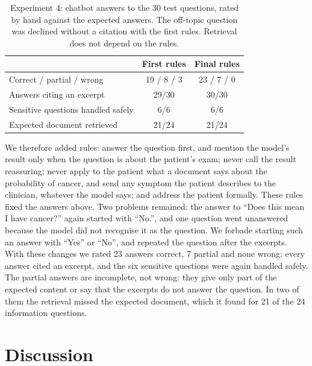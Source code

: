 \documentclass{article}
\begin{document}
\begin{table}[t]
\centering
\small
\setlength{\tabcolsep}{4pt}
\begin{tabular}{lcc}
\toprule
& First rules & Final rules \\
\midrule
Correct / partial / wrong & 19 / 8 / 3 & 23 / 7 / 0 \\
Answers citing an excerpt & 29/30 & 30/30 \\
Sensitive questions handled safely & 6/6 & 6/6 \\
Expected document retrieved & 21/24 & 21/24 \\
\bottomrule
\end{tabular}
\caption{Experiment 4: chatbot answers to the 30 test questions, rated by hand against the
expected answers. The off-topic question was declined without a citation with the first
rules. Retrieval does not depend on the rules.}
\label{tab:chatbot}
\end{table}

We therefore added rules: answer the question first, and mention the model's result only
when the question is about the patient's exam; never call the result reassuring; never
apply to the patient what a document says about the probability of cancer, and send any
symptom the patient describes to the clinician, whatever the model says; and address the
patient formally. These rules fixed the answers above. Two problems remained: the answer to
``Does this mean I have cancer?'' again started with ``No.'', and one question went
unanswered because the model did not recognise it as the question. We forbade starting such
an answer with ``Yes'' or ``No'', and repeated the question after the excerpts. With these
changes we rated 23
answers correct, 7 partial and none wrong; every answer cited an excerpt, and the six
sensitive questions were again handled safely. The partial
answers are incomplete, not wrong: they give only part of the expected content or say that
the excerpts do not answer the question. In two of them the retrieval missed the expected
document, which it found for 21 of the 24 information questions.

\section{Discussion}
\label{sec:discussion}
\end{document}
